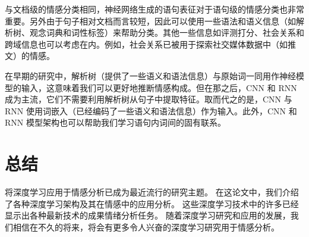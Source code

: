 \documentclass[lang=cn,11pt,a4paper]{elegantpaper}
\begin{document}
与文档级的情感分类相同，神经网络生成的语句表征对于语句级的情感分类也非常重要。另外由于句子相对文档而言较短，因此可以使用一些语法和语义信息（如解析树、观念词典和词性标签）来帮助分类。其他一些信息如评测打分、社会关系和跨域信息也可以考虑在内。例如，社会关系已被用于探索社交媒体数据中（如推文）的情感。

在早期的研究中，解析树（提供了一些语义和语法信息）与原始词一同用作神经模型的输入，这意味着我们可以更好地推断情感构成。但在那之后，CNN 和 RNN 成为主流，它们不需要利用解析树从句子中提取特征\cite{103}。取而代之的是，CNN 与 RNN 使用词嵌入（已经编码了一些语义和语法信息）作为输入。此外，CNN 和 RNN 模型架构也可以帮助我们学习语句内词间的固有联系。

\section{总结}
将深度学习应用于情感分析已成为最近流行的研究主题。 在这论文中，我们介绍了各种深度学习架构及其在情感中的应用分析。 这些深度学习技术中的许多已经显示出各种最新技术的成果情绪分析任务。 随着深度学习研究和应用的发展，我们相信在不久的将来，将会有更多令人兴奋的深度学习研究用于情感分析。


\end{document}
